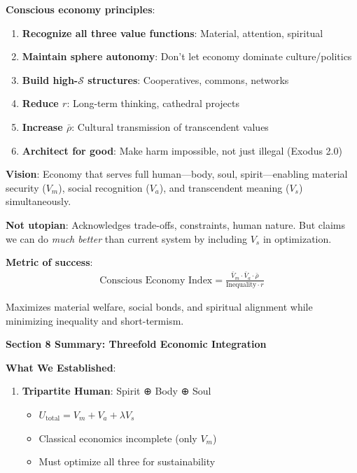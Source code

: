 \documentclass[11pt,a4paper]{article}
\theoremstyle{definition}
\theoremstyle{remark}
\begin{document}
\begin{enumerate}
\begin{mdframed}[backgroundcolor=purple!10,linewidth=2pt]
\textbf{Conscious economy principles}:
\begin{enumerate}
    \item \textbf{Recognize all three value functions}: Material, attention, spiritual
    \item \textbf{Maintain sphere autonomy}: Don't let economy dominate culture/politics
    \item \textbf{Build high-\(\mathcal{S}\) structures}: Cooperatives, commons, networks
    \item \textbf{Reduce \(r\)}: Long-term thinking, cathedral projects
    \item \textbf{Increase \(\bar{\rho}\)}: Cultural transmission of transcendent values
    \item \textbf{Architect for good}: Make harm impossible, not just illegal (Exodus 2.0)
\end{enumerate}

\textbf{Vision}: Economy that serves full human—body, soul, spirit—enabling material security (\(V_m\)), social recognition (\(V_a\)), and transcendent meaning (\(V_s\)) simultaneously.

\textbf{Not utopian}: Acknowledges trade-offs, constraints, human nature. But claims we can do \textit{much better} than current system by including \(V_s\) in optimization.

\textbf{Metric of success}:
\begin{align}
\text{Conscious Economy Index} = \frac{\bar{V}_m \cdot \bar{V}_a \cdot \bar{\rho}}{\text{Inequality} \cdot r}
\end{align}

Maximizes material welfare, social bonds, and spiritual alignment while minimizing inequality and short-termism.
\end{mdframed}

\begin{mdframed}[backgroundcolor=green!10,linewidth=2pt,linecolor=green!70!black]
\textbf{Section 8 Summary: Threefold Economic Integration}

\textbf{What We Established}:

\begin{enumerate}[nosep]
    \item \textbf{Tripartite Human}: Spirit ⊕ Body ⊕ Soul
        \begin{itemize}[nosep]
            \item \(U_{\text{total}} = V_m + V_a + \lambda V_s\)
            \item Classical economics incomplete (only \(V_m\))
            \item Must optimize all three for sustainability
        \end{itemize}
    

\end{enumerate}
\end{mdframed}
\end{enumerate}
\end{document}
